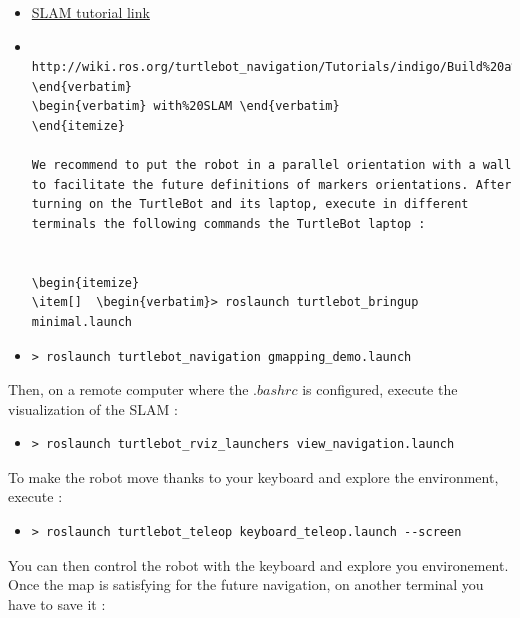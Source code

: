 \documentclass[10pt,a4paper]{article}
\begin{document}
\begin{itemize}
\item[•] \href{http://wiki.ros.org/turtlebot_navigation/Tutorials/indigo/Build%20a%20map%20with%20SLAM}{SLAM tutorial link} 
\item[ ] \begin{verbatim} http://wiki.ros.org/turtlebot_navigation/Tutorials/indigo/Build%20a%20map%20 \end{verbatim} 
\begin{verbatim} with%20SLAM \end{verbatim}
\end{itemize}

We recommend to put the robot in a parallel orientation with a wall to facilitate the future definitions of markers orientations. After turning on the TurtleBot and its laptop, execute in different terminals the following commands the TurtleBot laptop :


\begin{itemize}
\item[]  \begin{verbatim}> roslaunch turtlebot_bringup minimal.launch \end{verbatim}
\item[]  \begin{verbatim}> roslaunch turtlebot_navigation gmapping_demo.launch \end{verbatim}
\end{itemize}

Then, on a remote computer where the $.bashrc$ is configured, execute the visualization of the SLAM :

\begin{itemize}
\item[]  \begin{verbatim}> roslaunch turtlebot_rviz_launchers view_navigation.launch \end{verbatim}
\end{itemize}

To make the robot move thanks to your keyboard and explore the environment, execute :

\begin{itemize}
\item[]  \begin{verbatim}> roslaunch turtlebot_teleop keyboard_teleop.launch --screen \end{verbatim}
\end{itemize}

You can then control the robot with the keyboard and explore you environement. Once the map is satisfying for the future navigation, on another terminal you have to save it :
\end{document}
